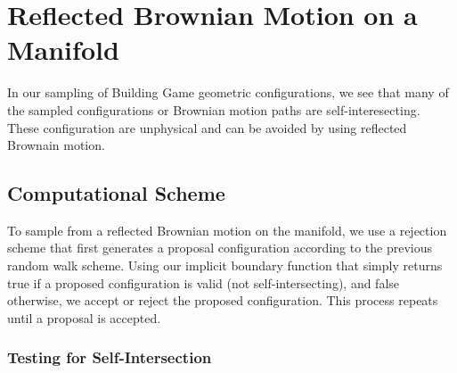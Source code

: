 \section{Reflected Brownian Motion on a Manifold}

In our sampling of Building Game geometric configurations, we see that many of the sampled configurations or Brownian motion paths are self-interesecting. These configuration are unphysical and can be avoided by using reflected Brownain motion. 

\subsection{Computational Scheme}

To sample from a reflected Brownian motion on the manifold, we use a rejection scheme that first generates a proposal configuration according to the previous random walk scheme. Using our implicit boundary function that simply returns true if a proposed configuration is valid (not self-intersecting), and false otherwise, we accept or reject the proposed configuration. This process repeats until a proposal is accepted. 


\subsubsection{Testing for Self-Intersection}

